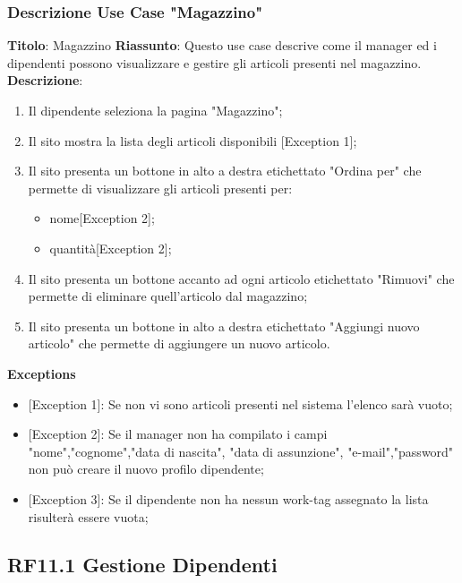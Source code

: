 \documentclass{report}
\begin{document}
\subsubsection*{Descrizione Use Case "Magazzino"}
\textbf{Titolo}: Magazzino \newline
\textbf{Riassunto}: Questo use case descrive come il manager ed i dipendenti possono visualizzare e gestire gli articoli presenti nel magazzino. \newline
\textbf{Descrizione}:
\begin{enumerate}
	\item Il dipendente seleziona la pagina "Magazzino";
	\item Il sito mostra la lista degli articoli disponibili [Exception 1];
	\item Il sito presenta un bottone in alto a destra etichettato "Ordina per" che permette di visualizzare gli articoli presenti per:
	\begin{itemize}
		\item nome[Exception 2];
		\item quantità[Exception 2];
	\end{itemize}
	\item Il sito presenta un bottone accanto ad ogni articolo etichettato "Rimuovi" che permette di eliminare quell'articolo dal magazzino;
	\item Il sito presenta un bottone in alto a destra etichettato "Aggiungi nuovo articolo" che permette di aggiungere un nuovo articolo.
	
\end{enumerate}
\textbf{Exceptions}
\begin{itemize}
	\item {[Exception 1]}: Se non vi sono articoli presenti nel sistema l'elenco sarà vuoto;
	\item {[Exception 2]}: Se il manager non ha compilato i campi "nome","cognome","data di nascita", "data di assunzione", "e-mail","password" non può creare il nuovo profilo dipendente;
	\item {[Exception 3]}: Se il dipendente non ha nessun work-tag assegnato la lista risulterà essere vuota;
\end{itemize}

\subsection*{RF11.1 Gestione Dipendenti}
\end{document}
